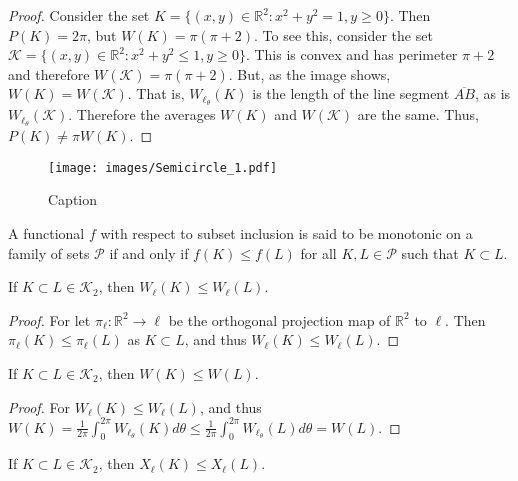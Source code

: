         \begin{proof}
            Consider the set
            $K=\{(x,y)\in\mathbb{R}^{2}:x^{2}+y^{2}=1,y\geq 0\}$.
            Then $P(K)=2\pi$, but $W(K)=\pi(\pi+2)$. To see this, consider the
            set $\mathcal{K}=\{(x,y)\in\mathbb{R}^2:x^{2}+y^{2}\leq{1},y\geq{0}\}$.
            This is convex and has perimeter $\pi+2$ and therefore
            $W(\mathcal{K})=\pi(\pi+2)$. But, as the image shows,
            $W(K) = W(\mathcal{K})$. That is, $W_{\ell_{\theta}}(K)$ is
            the length of the line segment $\overline{AB}$, as is
            $W_{\ell_{\theta}}(\mathcal{K})$. Therefore the averages
            $W(K)$ and $W(\mathcal{K})$ are the same. Thus, $P(K)\ne\pi{W}(K)$.
        \end{proof}
        \begin{figure}[H]
            \centering
            \captionsetup{type=figure}
            \texttt{[image: images/Semicircle\_1.pdf]}
            \caption{Caption}
            \label{fig:my_label}
        \end{figure}
        \begin{definition}
        A functional $f$ with respect to subset inclusion is said to be monotonic on a family of sets $\mathscr{P}$ if and only if $f(K)\leq f(L)$ for all $K,L \in \mathscr{P}$ such that $K\subset L$.
        \end{definition}
        \begin{theorem}
        If $K\subset L \in \mathscr{K}_2$, then $W_{\ell}(K) \leq W_{\ell}(L)$.
        \end{theorem}
        \begin{proof}
        For let $\pi_{\ell}:\mathbb{R}^2 \rightarrow \ell$ be the orthogonal projection map of $\mathbb{R}^2$ to $\ell$. Then $\pi_{\ell}(K)\leq \pi_{\ell}(L)$ as $K\subset L$, and thus $W_{\ell}(K)\leq W_{\ell}(L)$.
        \end{proof}
        \begin{theorem}
        If $K\subset L\in \mathscr{K}_2$, then $W(K)\leq W(L)$.
        \end{theorem}
        \begin{proof}
        For $W_{\ell}(K)\leq W_{\ell}(L)$, and thus $W(K)=\frac{1}{2\pi}\int_{0}^{2\pi}W_{\ell_{\theta}}(K)d\theta \leq \frac{1}{2\pi}\int_{0}^{2\pi}W_{\ell_{\theta}}(L)d\theta=W(L)$.
        \end{proof}
        \begin{theorem}
        If $K\subset L\in \mathscr{K}_2$, then $X_{\ell}(K)\leq X_{\ell}(L)$.
        \end{theorem}
